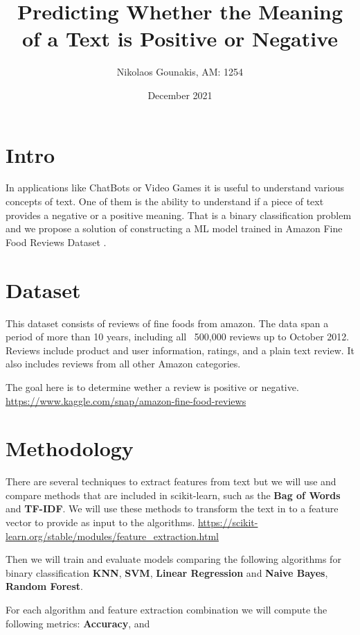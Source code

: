 \documentclass[12pt]{extarticle}
\title{Predicting Whether the Meaning of a Text is Positive or Negative}
\author{Nikolaos Gounakis, AM: 1254}
\date{December 2021}
\begin{document}
\maketitle

\section{Intro}
In applications like ChatBots or Video Games it is useful to understand
various concepts of text. One of them is the ability to understand if a piece of 
text provides a negative or a positive meaning. That is a binary classification 
problem and we propose a solution of constructing a ML model trained in 
Amazon Fine Food Reviews Dataset \cite{10.1145/2488388.2488466}. 

\section{Dataset}
This dataset consists of reviews of fine foods from amazon. 
The data span a period of more than 10 years, including all ~500,000 reviews up to October 2012. Reviews include product and user information, ratings, and a plain text review. 
It also includes reviews from all other Amazon categories.

The goal here is to determine wether a review is positive or negative.
\url{https://www.kaggle.com/snap/amazon-fine-food-reviews}

\section{Methodology}

There are several techniques to extract features from text but we will use 
and compare methods that are included in scikit-learn, such as the \textbf{Bag of Words} and
\textbf{TF-IDF}. We will use these methods to transform the text in to a feature
vector to provide as input to the algorithms.
\url{https://scikit-learn.org/stable/modules/feature_extraction.html}

Then we will train and evaluate models comparing the following algorithms for 
binary classification \textbf{KNN}, \textbf{SVM}, \textbf{Linear Regression} and 
\textbf{Naive Bayes}, \textbf{Random Forest}.

For each algorithm and feature extraction combination we will compute the following metrics:
\textbf{Accuracy},  and



\end{document}
